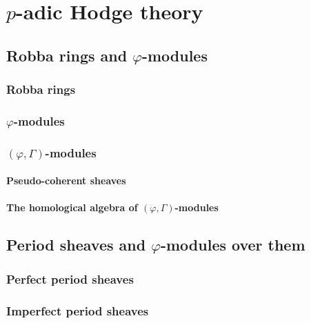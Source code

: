 \chapter{\texorpdfstring{$p$}{}-adic Hodge theory}
    \begin{abstract}
        
    \end{abstract}
    
    \minitoc
    
    \section{Robba rings and \texorpdfstring{$\varphi$}{}-modules}
        \subsection{Robba rings}
        
        \subsection{\texorpdfstring{$\varphi$}{}-modules}
    
        \subsection{\texorpdfstring{$(\varphi, \Gamma)$}{}-modules}
            \subsubsection{Pseudo-coherent sheaves}
            
            \subsubsection{The homological algebra of \texorpdfstring{$(\varphi, \Gamma)$}{}-modules}
    
    \section{Period sheaves and \texorpdfstring{$\varphi$}{}-modules over them}
        \subsection{Perfect period sheaves}
        
        \subsection{Imperfect period sheaves}